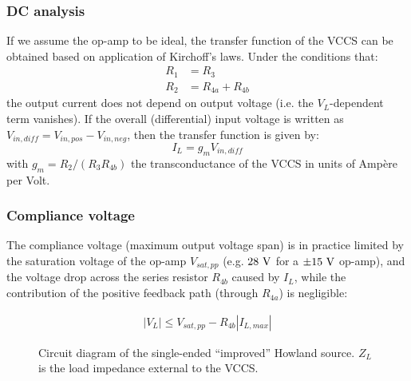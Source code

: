 \documentclass[conference]{IEEEtran}
\begin{document}
\subsubsection{DC analysis}

If we assume the op-amp to be ideal, the transfer function of the VCCS can be obtained based on application of Kirchoff's laws. Under the conditions that:
\begin{subequations}
\label{eq:single_ended_howland_conditions}
\begin{align}
R_1 &= R_3\\
R_2 &= R_{4a} + R_{4b}
\end{align}
\end{subequations}
the output current does not depend on output voltage (i.e. the $V_L$-dependent term vanishes). If the overall (differential) input voltage is written as $V_{in,dif\!f}=V_{in,pos}-V_{in,neg}$, then the transfer function is given by:
\begin{equation}
\label{eq:single_ended_gain}
I_L = g_mV_{in,dif\!f}
\end{equation}
with $g_m = R_2/(R_3R_{4b})$ the transconductance of the VCCS in units of Amp\`{e}re per Volt.

\subsubsection{Compliance voltage}
\label{sec:single_ended_compliance_voltage}

The compliance voltage (maximum output voltage span) is in practice limited by the saturation voltage of the op-amp $V_{sat,pp}$ (e.g. $28~\volt$ for a $\pm15~\volt$ op-amp), and the voltage drop across the series resistor $R_{4b}$ caused by $I_L$, while the contribution of the positive feedback path (through $R_{4a}$) is negligible:

\begin{align}
\label{eq:single_ended_compliance_voltage}
|V_L|\leq V_{sat,pp} - R_{4b}|I_{L,max}|
\end{align}

\begin{figure}[t]
\hspace{-4.9cm}\makebox[\textwidth][c]{%
\scalebox{.75}{%

}}
\caption{\small Circuit diagram of the single-ended ``improved'' Howland source. $Z_L$ is the load impedance external to the VCCS.}
\label{fig:single_ended_howland}
\end{figure}
\end{document}
